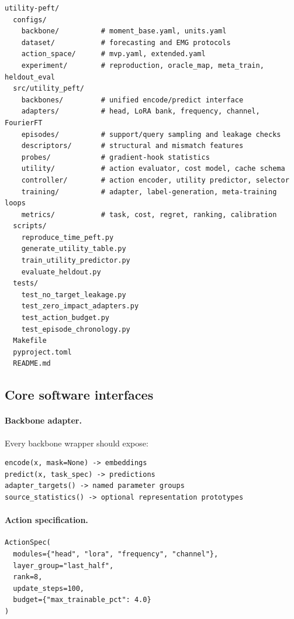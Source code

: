 \documentclass[10pt]{article}
\begin{document}
\begin{lstlisting}
utility-peft/
  configs/
    backbone/          # moment_base.yaml, units.yaml
    dataset/           # forecasting and EMG protocols
    action_space/      # mvp.yaml, extended.yaml
    experiment/        # reproduction, oracle_map, meta_train, heldout_eval
  src/utility_peft/
    backbones/         # unified encode/predict interface
    adapters/          # head, LoRA bank, frequency, channel, FourierFT
    episodes/          # support/query sampling and leakage checks
    descriptors/       # structural and mismatch features
    probes/            # gradient-hook statistics
    utility/           # action evaluator, cost model, cache schema
    controller/        # action encoder, utility predictor, selector
    training/          # adapter, label-generation, meta-training loops
    metrics/           # task, cost, regret, ranking, calibration
  scripts/
    reproduce_time_peft.py
    generate_utility_table.py
    train_utility_predictor.py
    evaluate_heldout.py
  tests/
    test_no_target_leakage.py
    test_zero_impact_adapters.py
    test_action_budget.py
    test_episode_chronology.py
  Makefile
  pyproject.toml
  README.md
\end{lstlisting}

\subsection{Core software interfaces}

\paragraph{Backbone adapter.} Every backbone wrapper should expose:
\begin{lstlisting}
encode(x, mask=None) -> embeddings
predict(x, task_spec) -> predictions
adapter_targets() -> named parameter groups
source_statistics() -> optional representation prototypes
\end{lstlisting}

\paragraph{Action specification.}
\begin{lstlisting}
ActionSpec(
  modules={"head", "lora", "frequency", "channel"},
  layer_group="last_half",
  rank=8,
  update_steps=100,
  budget={"max_trainable_pct": 4.0}
)
\end{lstlisting}
\end{document}
